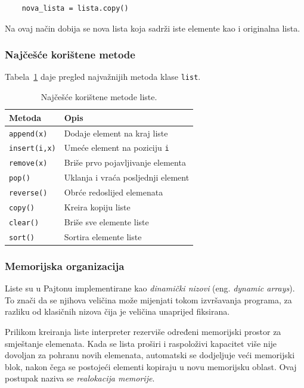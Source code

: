 \begin{verbatim}
	nova_lista = lista.copy()
\end{verbatim}

Na ovaj način dobija se nova lista koja sadrži iste elemente kao i originalna lista.

\subsubsection*{Najčešće korištene metode}

Tabela~\ref{tab:list_methods} daje pregled najvažnijih metoda klase \texttt{list}.

\begin{table}[H]
	\centering
	\caption{Najčešće korištene metode liste.}
	\label{tab:list_methods}
	\begin{tabular}{l|l}
		\hline
		\textbf{Metoda} & \textbf{Opis} \\ \hline
		\texttt{append(x)} & Dodaje element na kraj liste \\
		\texttt{insert(i,x)} & Umeće element na poziciju \texttt{i} \\
		\texttt{remove(x)} & Briše prvo pojavljivanje elementa \\
		\texttt{pop()} & Uklanja i vraća posljednji element \\
		\texttt{reverse()} & Obrće redoslijed elemenata \\
		\texttt{copy()} & Kreira kopiju liste \\
		\texttt{clear()} & Briše sve elemente liste \\
		\texttt{sort()} & Sortira elemente liste \\
		\hline
	\end{tabular}
\end{table}

\subsubsection*{Memorijska organizacija}

Liste su u Pajtonu implementirane kao \textit{dinamički nizovi} (eng. \textit{dynamic arrays}). To znači da se njihova veličina može mijenjati tokom izvršavanja programa, za razliku od klasičnih nizova čija je veličina unaprijed fiksirana.

Prilikom kreiranja liste interpreter rezerviše određeni memorijski prostor za smještanje elemenata. Kada se lista proširi i raspoloživi kapacitet više nije dovoljan za pohranu novih elemenata, automatski se dodjeljuje veći memorijski blok, nakon čega se postojeći elementi kopiraju u novu memorijsku oblast. Ovaj postupak naziva se \textit{realokacija memorije}.

